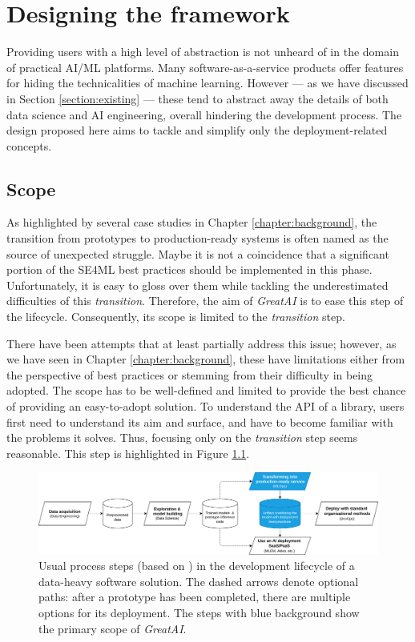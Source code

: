\chapter{Designing the framework} \label{chapter:design}

Providing users with a high level of abstraction is not unheard of in the domain of practical AI/ML platforms. Many software-as-a-service products offer features for hiding the technicalities of machine learning. However --- as we have discussed in Section \ref{section:existing} --- these tend to abstract away the details of both data science and AI engineering, overall hindering the development process. The design proposed here aims to tackle and simplify only the deployment-related concepts.

\section{Scope} \label{section:scope}

As highlighted by several case studies in Chapter \ref{chapter:background}, the transition from prototypes to production-ready systems is often named as the source of unexpected struggle. Maybe it is not a coincidence that a significant portion of the SE4ML best practices should be implemented in this phase. Unfortunately, it is easy to gloss over them while tackling the underestimated difficulties of this \textit{transition}. Therefore, the aim of \textit{GreatAI} is to ease this step of the lifecycle. Consequently, its scope is limited to the \textit{transition} step.

There have been attempts that at least partially address this issue; however, as we have seen in Chapter \ref{chapter:background}, these have limitations either from the perspective of best practices or stemming from their difficulty in being adopted. The scope has to be well-defined and limited to provide the best chance of providing an easy-to-adopt solution. To understand the API of a library, users first need to understand its aim and surface, and have to become familiar with the problems it solves. Thus, focusing only on the \textit{transition} step seems reasonable. This step is highlighted in Figure \ref{fig:scope}.

\begin{figure}
    \centering
    \includegraphics[width=\linewidth]{figures/scope.drawio.png}
    \captionsetup{width=.9\linewidth}
    \caption{Usual process steps (based on \cite{john2020architecting}) in the development lifecycle of a data-heavy software solution. The dashed arrows denote optional paths: after a prototype has been completed, there are multiple options for its deployment. The steps with blue background show the primary scope of \textit{GreatAI}.}
    \label{fig:scope}
\end{figure}

